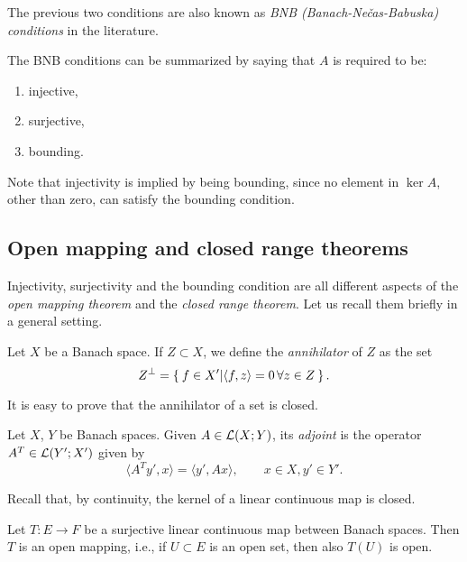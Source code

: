 The previous two conditions are also known as \emph{BNB (Banach-Ne\v{c}as-Babuska) conditions} in the literature.
\begin{remark}\label{rmk:bnb_conditions}
	The BNB conditions can be summarized by saying that $A$ is required to be:
	\begin{enumerate}
		\item injective,
		\item surjective,
		\item bounding.
	\end{enumerate}
	Note that injectivity is implied by being bounding, since no element in $\ker A$, other than zero, can satisfy the bounding condition.
\end{remark}


\subsection{Open mapping and closed range theorems}
Injectivity, surjectivity and the bounding condition are all different aspects of the \emph{open mapping theorem} and the \emph{closed range theorem}. Let us recall them briefly in a general setting.

\begin{definition}
	Let $X$ be a Banach space. If $Z \subset X$, we define the \emph{annihilator} of $Z$ as the set
	\[
	Z^\perp = \Set{f \in X' \vert \langle f, z \rangle = 0 \, \forall z \in Z}.
	\]
\end{definition}
It is easy to prove that the annihilator of a set is closed.

\begin{definition}
	Let $X$, $Y$ be Banach spaces. Given $A \in \mathcal{L}(X;Y)$, its \emph{adjoint} is the operator $A^T \in \mathcal{L}(Y';X')$ given by
	\[
	\langle A^T y', x \rangle = \langle y', Ax \rangle, \qquad x \in X, y' \in Y'.
	\]
\end{definition}
Recall that, by continuity, the kernel of a linear continuous map is closed. 

\begin{theorem}\label{thm:open_mapping}
	Let $T: E \to F$ be a surjective linear continuous map between Banach spaces. Then $T$ is an open mapping, i.e., if $U \subset E$ is an open set, then also $T(U)$ is open.
\end{theorem}

